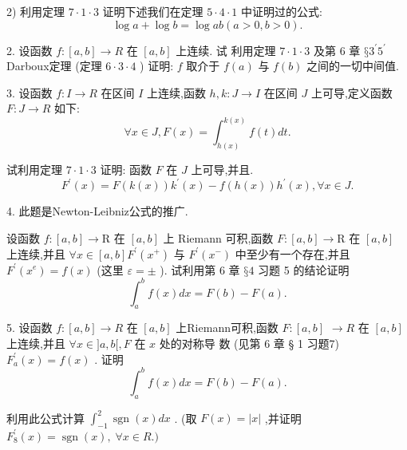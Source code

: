 2) 利用定理 $7 \cdot  1 \cdot  3$ 证明下述我们在定理 $5 \cdot  4 \cdot  1$ 中证明过的公式:
$$\log a + \log b = \log {ab}\left( {a > 0,b > 0}\right) .$$

2. 设函数 $f : \left\lbrack  {a,b}\right\rbrack   \rightarrow  R$ 在 $\left\lbrack  {a,b}\right\rbrack$ 上连续. 试 利用定理 $7 \cdot  1 \cdot  3$ 及第 6 章 $§{3}^{\prime }{5}^{\prime }$ Darboux定理 (定理 $6 \cdot  3 \cdot  4$ ) 证明: $f$ 取介于 $f\left( a\right)$ 与 $f\left( b\right)$ 之间的一切中间值.

3. 设函数 $f : I \rightarrow  R$ 在区间 $I$ 上连续,函数 $h,k : J \rightarrow  I$ 在区间 $J$ 上可导,定义函数 $F : J \rightarrow  R$ 如下:
$$\forall x \in  J,F\left( x\right)  = {\int }_{h\left( x\right) }^{k\left( x\right) }f\left( t\right) {dt}.$$

试利用定理 $7 \cdot  1 \cdot  3$ 证明: 函数 $F$ 在 $J$ 上可导,并且.
$${F}^{\prime }\left( x\right)  = F\left( {k\left( x\right) }\right) {k}^{\prime }\left( x\right)  - f\left( {h\left( x\right) }\right) {h}^{\prime }\left( x\right) ,\forall x \in  J.$$

4. 此题是Newton-Leibniz公式的推广.

设函数 $f : \left\lbrack  {a,b}\right\rbrack   \rightarrow  \mathrm{R}$ 在 $\left\lbrack  {a,b}\right\rbrack$ 上 Riemann 可积,函数 $F : \left\lbrack  {a,b}\right\rbrack   \rightarrow  \mathrm{R}$ 在 $\left\lbrack  {a,b}\right\rbrack$ 上连续,并且 $\forall x \in  \left\lbrack  {a,b}\right\rbrack  {F}^{\prime }\left( {x}^{ + }\right)$ 与 ${F}^{\prime }\left( {x}^{ - }\right)$ 中至少有一个存在,并且 ${F}^{\prime }\left( {x}^{e}\right)  = f\left( x\right)$ (这里 $\varepsilon  =  \pm$ ). 试利用第 6 章 $§4$ 习题 5 的结论证明
$${\int }_{a}^{b}f\left( x\right) {dx} = F\left( b\right)  - F\left( a\right) .$$

5. 设函数 $f : \left\lbrack  {a,b}\right\rbrack   \rightarrow  R$ 在 $\left\lbrack  {a,b}\right\rbrack$ 上Riemann可积,函数 $F : \left\lbrack  {a,b}\right\rbrack$  $\rightarrow  R$ 在 $\left\lbrack  {a,b}\right\rbrack$ 上连续,并且 $\forall x \in  \rbrack a,b\lbrack ,F$ 在 $x$ 处的对称导 数 (见第 6 章 § 1 习题7) ${F}_{a}^{\prime }\left( x\right)  = f\left( x\right)$ . 证明
$${\int }_{a}^{b}f\left( x\right) {dx} = F\left( b\right)  - F\left( a\right) .$$

利用此公式计算 ${\int }_{-1}^{2}\operatorname{sgn}\left( x\right) {dx}$ . (取 $F\left( x\right)  = \left| x\right|$ ,并证明 ${F}_{8}^{\prime }\left( x\right)  = \operatorname{sgn}\left( x\right) ,\;\forall x \in  R.)$

